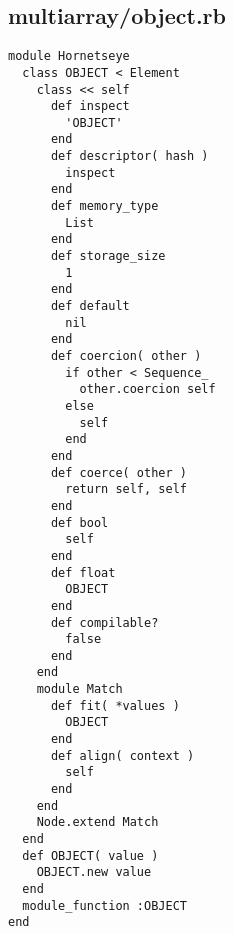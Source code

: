 \subsection{multiarray/object.rb}\label{cha:multiarray-object-rb}
\begin{lstlisting}
module Hornetseye
  class OBJECT < Element
    class << self
      def inspect
        'OBJECT'
      end
      def descriptor( hash )
        inspect
      end
      def memory_type
        List
      end
      def storage_size
        1
      end
      def default
        nil
      end
      def coercion( other )
        if other < Sequence_
          other.coercion self
        else
          self
        end
      end
      def coerce( other )
        return self, self
      end
      def bool
        self
      end
      def float
        OBJECT
      end
      def compilable?
        false
      end
    end
    module Match
      def fit( *values )
        OBJECT
      end
      def align( context )
        self
      end
    end
    Node.extend Match
  end
  def OBJECT( value )
    OBJECT.new value
  end
  module_function :OBJECT
end
\end{lstlisting}

